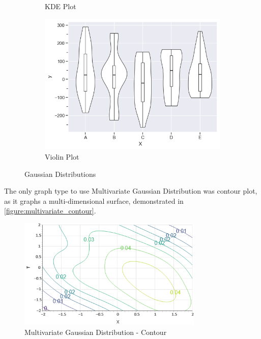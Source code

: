 \begin{figure}
\begin{subfigure}[b]{0.29\textwidth}
        \caption{KDE Plot}
        \label{figure:kdeplot}
    \end{subfigure}
    \begin{subfigure}[b]{0.29\textwidth}
        \centering
        \includegraphics[width=\textwidth]{figures/body/methodology/norm_violin.png}
        \caption{Violin Plot}
        \label{figure:norm_violin}
    \end{subfigure}
    \caption{Gaussian Distributions}
    \label{figure:normal_distribution}
\end{figure}

The only graph type to use Multivariate Gaussian Distribution was contour plot, as it graphs a multi-dimensional surface, demonstrated in \autoref{figure:multivariate_contour}.

\hfill

\begin{figure}[hbt]
    \centering
    \includegraphics[width=250pt,keepaspectratio]{figures/body/methodology/multi_contour.png}
    \caption{Multivariate Gaussian Distribution - Contour}
    \label{figure:multivariate_contour}
\end{figure}

